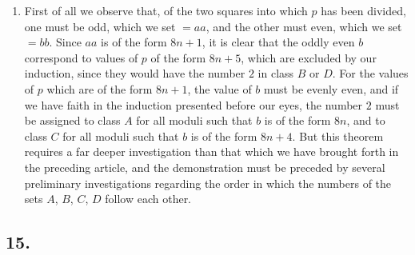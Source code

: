 \documentclass[twoside,12pt]{memoir}
\begin{document}
\begin{enumerate}
    \item First of all we observe that, of the two squares into which \(p\) has been divided, one must be odd, which we set \(=a a\), and the other must even, which we set \(=b b\). Since \(a a\) is of the form \(8 n+1\), it is clear that the oddly even \(b\) correspond to values of \(p\) of the form \(8 n+5\), which are excluded by our induction, since they would have the number \(2\) in class \(B\) or \(D\). For the values of \(p\) which are of the form \(8 n+1\), the value of \(b\) must be evenly even, and if we have faith in the induction presented before our eyes, the number \(2\) must be assigned to class \(A\) for all moduli such that \(b\) is of the form \(8 n\), and to class \(C\) for all moduli such that \(b\) is of the form \(8 n+4\). But this theorem requires a far deeper investigation than that which we have brought forth in the preceding article, and the demonstration must be preceded by several preliminary investigations regarding the order in which the numbers of the sets \(A\), \(B\), \(C\), \(D\) follow each other.
\end{enumerate}

\subsection*{15.}
\end{document}
